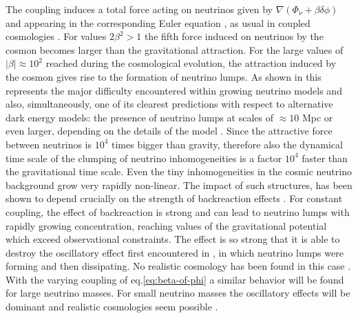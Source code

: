 The coupling induces a total force acting on neutrinos given by $\nabla(\Phi_{\nu}+\beta\delta\phi)$
and appearing in the corresponding Euler equation \cite{pettorino_neutrino_2010},
as usual in coupled cosmologies \cite{baldi_hydrodynamical_2010}.
For values $2\beta^{2}>1$ the fifth force induced on neutrinos by
the cosmon becomes larger than the gravitational attraction. For the
large values of $|\beta|\approx10^{2}$ reached during the cosmological
evolution, the attraction induced by the cosmon gives rise to the
formation of neutrino lumps. As shown in \cite{mota_neutrino_2008,pettorino_neutrino_2010}
this represents the major difficulty encountered within growing neutrino
models and also, simultaneously, one of its clearest predictions with
respect to alternative dark energy models: the presence of neutrino
lumps at scales of $\approx10$ Mpc or even larger, depending on the
details of the model \cite{mota_neutrino_2008}. Since the attractive
force between neutrinos is $10^{4}$ times bigger than gravity, therefore
also the dynamical time scale of the clumping of neutrino inhomogeneities
is a factor $10^{4}$ faster than the gravitational time scale. Even
the tiny inhomogeneities in the cosmic neutrino background grow very
rapidly non-linear. The impact of such structures, has been shown
to depend crucially on the strength of backreaction effects \cite{ayaita_structure_2012,ayaita_nonlinear_2016}.
For constant coupling, the effect of backreaction is strong and can
lead to neutrino lumps with rapidly growing concentration, reaching
values of the gravitational potential which exceed observational constraints.
The effect is so strong that it is able to destroy the oscillatory
effect first encountered in \cite{baldi_hydrodynamical_2010}, in
which neutrino lumps were forming and then dissipating. No realistic
cosmology has been found in this case \cite{fuhrer_backreaction_2015}.
With the varying coupling of eq.\ref{eq:beta-of-phi} a similar
behavior will be found for large neutrino masses. For small neutrino
masses the oscillatory effects will be dominant and realistic cosmologies
seem possible \cite{ayaita_nonlinear_2016}.




